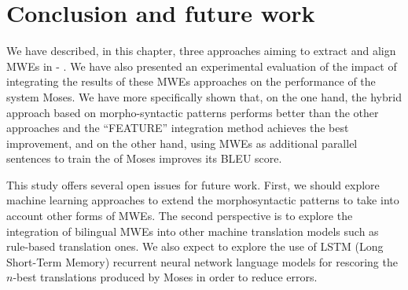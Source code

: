 \documentclass[output=paper,modfonts,nonflat]{langsci/langscibook}
\begin{document}
\section{Conclusion and future work}\label{sec:semmar:6}

We have described, in this chapter, three approaches aiming to extract and align MWEs in - . We have also presented an experimental evaluation of the impact of integrating the results of these MWEs  approaches on the performance of the  system Moses. We have more specifically shown that, on the one hand, the hybrid approach based on morpho-syntactic patterns performs better than the other approaches and the ``FEATURE'' integration method achieves the best improvement, and on the other hand, using MWEs as additional parallel sentences to train the  of Moses improves its BLEU score.

This study offers several open issues for future work. First, we should explore machine learning approaches to extend the morphosyntactic patterns to take into account other forms of MWEs. The second perspective is to explore the integration of bilingual MWEs into other machine translation models such as rule-based translation ones. We also expect to explore the use of LSTM (Long Short-Term Memory) recurrent neural network language models for rescoring the $n$-best translations produced by Moses in order to reduce  errors.



\end{document}
